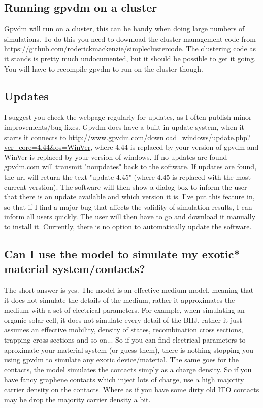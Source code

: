 \documentclass[11pt]{article}
\begin{document}
\subsection{Running gpvdm on a cluster}
Gpvdm will run on a cluster, this can be handy when doing large numbers of simulations.  To do this you need to download the cluster management code from  \url{https://github.com/roderickmackenzie/simpleclustercode}.  The clustering code as it stands is pretty much undocumented, but it should be possible to get it going.  You will have to recompile gpvdm to run on the cluster though.

\subsection{Updates}
I suggest you check the webpage regularly for updates, as I often publish minor improvements/bug fixes.  Gpvdm does have a built in update system, when it starts it connects to  \url{http://www.gpvdm.com/download_windows/update.php?ver_core=4.44&os=WinVer}, where 4.44 is replaced by your version of gpvdm and WinVer is replaced by your version of windows.  If no updates are found gpvdm.com will transmit "noupdates" back to the software.  If updates are found, the url will return the text "update 4.45" (where 4.45 is replaced with the most current verstion).  The software will then show a dialog box to inform the user that there is an update available and which version it is.    I've put this feature in, so that if I find a major bug that affects the validity of simulation results, I can inform all users quickly.  The user will then have to go and download it manually to install it.  Currently, there is no option to automatically update the software. 

\subsection{Can I use the model to simulate my exotic* material system/contacts?}
The short answer is yes.  The model is an effective medium model, meaning that it does not simulate the details of the medium, rather it approximates the medium with a set of electrical parameters.  For example, when simulating an organic solar cell, it does not simulate every detail of the BHJ, rather it just assumes an effective mobility, density of states, recombination cross sections, trapping cross sections and so on...  So if you can find electrical parameters to aproximate your material system (or guess them), there is nothing stopping you using gpvdm to simulate any exotic device/material.  The same goes for the contacts, the model simulates the contacts simply as a charge density. So if you have fancy graphene contacts which inject lots of charge, use a high majority carrier density on the contacts.  Where as if you have some dirty old ITO contacts may be drop the majority carrier density a bit.
\end{document}
